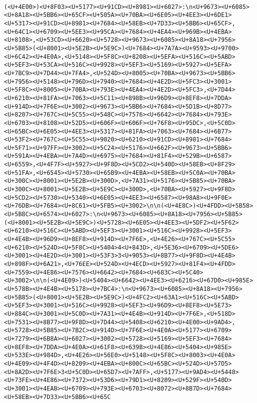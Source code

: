 \documentclass[
]{article}
\begin{document}
\begin{verbatim}
                                                                                                                                                                                                                                                (<U+4E00>)<U+8F03><U+5177><U+91CD><U+8981><U+6027>:\n<U+9673><U+6085><U+8A18><U+5BB6><U+65CF><U+505A><U+70BA><U+6E05><U+4EE3><U+6DE1><U+5317><U+91CD><U+8981><U+7684><U+58EB><U+7D33><U+5BB6><U+65CF>,<U+64C1><U+6709><U+5EE3><U+95CA><U+7684><U+4EA4><U+969B><U+4EBA><U+8108>,<U+53CD><U+6620><U+5728><U+9673><U+6085><U+8A18><U+7956><U+5B85>(<U+8001><U+5E2B><U+5E9C>)<U+7684><U+7A7A><U+9593><U+9700><U+6C42><U+4E0A>,<U+5148><U+5F8C><U+8208><U+5EFA><U+516C><U+5ABD><U+5EF3><U+53CA><U+516C><U+9928><U+5EF3><U+5169><U+5927><U+5EFA><U+7BC9><U+7D44><U+7FA4>,<U+524D><U+8005><U+70BA><U+9673><U+5BB6><U+7956><U+5148><U+796D><U+7940><U+7684><U+4E2D><U+5FC3><U+3001><U+5F8C><U+8005><U+70BA><U+793E><U+4EA4><U+4E2D><U+5FC3>,<U+7D44><U+6210><U+81FA><U+7063><U+5C11><U+898B><U+96D9><U+8EF8><U+7DDA><U+914D><U+7F6E><U+3002><U+9673><U+5BB6><U+7684><U+5D1B><U+8D77><U+8207><U+767C><U+5C55><U+548C><U+7576><U+6642><U+7684><U+793E><U+6703><U+8108><U+52D5><U+606F><U+606F><U+76F8><U+95DC>,<U+5C0D><U+65BC><U+6E05><U+4EE3><U+5317><U+81FA><U+7063><U+7684><U+6B77><U+53F2><U+767C><U+5C55><U+9020><U+6210><U+91CD><U+8981><U+7684><U+5F71><U+97FF><U+3002><U+5C24><U+5176><U+662F><U+9673><U+5BB6><U+591A><U+4EBA><U+7A4D><U+6975><U+7684><U+81F4><U+529B><U+6587><U+6559>,<U+4F7F><U+5927><U+9F8D><U+5CD2><U+540D><U+58EB><U+8F29><U+51FA>,<U+6545><U+5730><U+65B9><U+4EBA><U+58EB><U+5C0A><U+70BA><U+300C><U+8001><U+5E2B><U+300D>,<U+7A31><U+5176><U+5B85><U+70BA><U+300C><U+8001><U+5E2B><U+5E9C><U+300D>,<U+70BA><U+5927><U+9F8D><U+5CD2><U+5730><U+5340><U+6E05><U+4EE3><U+6587><U+98A8><U+9F0E><U+76DB><U+7684><U+8C61><U+5FB5><U+3002>\n\n(<U+4E8C>)<U+4FDD><U+5B58><U+5B8C><U+6574><U+6027>:\n<U+9673><U+6085><U+8A18><U+7956><U+5B85>(<U+8001><U+5E2B><U+5E9C>)<U+5728><U+6E05><U+4EE3><U+5DF2><U+5F62><U+6210><U+516C><U+5ABD><U+5EF3><U+3001><U+516C><U+9928><U+5EF3><U+4E4B><U+96D9><U+8EF8><U+914D><U+7F6E>,<U+4E26><U+767C><U+5C55><U+6210><U+524D><U+5F8C><U+5404>4<U+843D>,<U+5E36><U+6709><U+5DE6><U+3001><U+4E2D><U+3001><U+53F3>3<U+9053><U+8B77><U+9F8D><U+4E4B><U+898F><U+6A21>,<U+76EE><U+524D><U+4ECD><U+5927><U+81F4><U+4FDD><U+7559><U+4E86><U+7576><U+6642><U+7684><U+683C><U+5C40><U+3002>\n\n(<U+4E09>)<U+5404><U+6642><U+4EE3><U+6216><U+67D0><U+985E><U+578B><U+4E4B><U+5178><U+7BC4>:\n<U+9673><U+6085><U+8A18><U+7956><U+5B85>(<U+8001><U+5E2B><U+5E9C>)<U+4FC2><U+63A1><U+516C><U+5ABD><U+5EF3><U+3001><U+516C><U+9928><U+5EF3><U+96D9><U+8EF8><U+5E73><U+884C><U+3001><U+5C0D><U+7A31><U+4E4B><U+914D><U+7F6E>,<U+518D><U+7531><U+8B77><U+9F8D><U+7D44><U+5408><U+6210><U+4E00><U+9AD4>,<U+5728><U+5B85><U+7B2C><U+914D><U+7F6E><U+4E0A><U+5177><U+6709><U+7279><U+6B8A><U+6027><U+3002><U+5728><U+5169><U+5EF3><U+7684><U+8EF8><U+7DDA><U+4E0A><U+61F8><U+639B><U+4E86><U+5404><U+985E><U+533E><U+984D>,<U+4E26><U+56E0><U+5148><U+5F8C><U+8003><U+4E0A><U+4E09><U+4F4D><U+8209><U+4EBA><U+800C><U+65BC><U+524D><U+57D5><U+8A2D><U+7F6E>3<U+5C0D><U+65D7><U+7AFF>,<U+5177><U+9AD4><U+5448><U+73FE><U+4E86><U+7372><U+53D6><U+79D1><U+8209><U+529F><U+540D><U+3001><U+4EAB><U+6709><U+793E><U+6703><U+8072><U+8B7D><U+7684><U+58EB><U+7D33><U+5BB6><U+65C
\end{verbatim}
\end{document}
